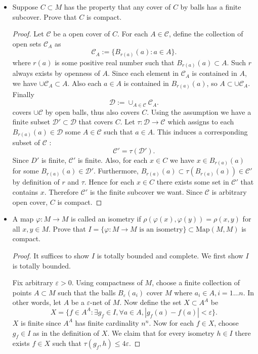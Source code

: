 
\begin{itemize}
	\item Suppose $C \subset M$ has the property that any cover of $C$ by balls has a finite subcover. Prove that $C$ is compact.
\begin{proof}
	Let $\mathcal{C}$ be a open cover of $C$. For each  $A \in \mathcal{C}$, define the collection of open sets $\mathcal{C}_A$ as
	\[
		\mathcal{C}_A := \{B_{r(a)}(a): a \in A\} 
	.\] 
	where $r(a)$ is some positive real number such that $B_{r(a)}(a) \subset A$. Such $r$ always exists by openness of $A$. Since each element in $\mathcal{C}_A$ is contained in $A$, we have $\cup \mathcal{C}_A \subset A$. Also each $a \in A$ is contained in $B_{r(a)}(a)$, so $A \subset \cup \mathcal{C}_A$. Finally
	\[
		\mathcal{D}:=\cup_{A \in \mathcal{C}} \mathcal{C}_{A}	.\] 
		covers $\cup \mathcal{C}$ by open balls, thus also covers $C$. Using the assumption we have a finite subset $\mathcal{D}' \subset \mathcal{D}$ that covers $C$. Let $\tau: \mathcal{D} \to \mathcal{C}$ which assigns to each $B_{r(a)}(a) \in \mathcal{D}$ some $A \in \mathcal{C}$ such that $a \in A$. This induces a corresponding subset of $\mathcal{C}$ :
		\[
		\mathcal{C}' = \tau(\mathcal{D}') 
		.\] 
		Since $D'$ is finite, $ \mathcal{C}'$ is finite. Also, for each $x \in C$ we have $x \in B_{r(a)}(a)$ for some $B_{r(a)}(a) \in \mathcal{D}'$. Furthermore, $ B_{r(a)}(a) \subset \tau(B_{r(a)}(a))  \in \mathcal{C}'$ by definition of $r$ and $\tau$. Hence for each $x \in C$ there exists some set in $\mathcal{C}'$ that contains $x$. Therefore $\mathcal{C}'$ is the finite subcover we want. Since $\mathcal{C}$ is arbitrary open cover, $C$ is compact.
\end{proof}

\item A map $\varphi: M \to  M$ is called an isometry if $\rho(\varphi(x), \varphi(y)) = \rho(x,y)$ for all $x, y \in M$. Prove that $I = \{\varphi: M \to  M \text{ is an isometry}\} \subset \text{Map}(M, M)$ is compact.
\begin{proof}
It suffices to show $I$ is totally bounded and complete. We first show $I$ is totally bounded.

Fix arbitrary $\varepsilon>0$. Using compactness of $M$, choose a finite collection of points $A \subset M$ such that the balls $B_{\varepsilon}(a_i)$ cover $M$ where $a_i \in A, i = 1\ldots n$. In other words, let $A$ be a $\varepsilon$-net of $M$. Now define the set $X \subset A^A$ be
\[
	X = \{f \in A^A: \exists g_f \in I, \forall a \in A, \left| g_f(a) - f(a) \right| < \varepsilon\} 
.\] 
$X$ is finite since  $A^A$ has finite cardinality $n^n$. Now for each $f \in X$, choose $g_f \in I$ as in the definition of $X$. We claim that for every isometry $h \in I$ there exists $f \in X$ such that $\tau(g_f, h) \le  4 \varepsilon$.


\end{proof}
\end{itemize}
